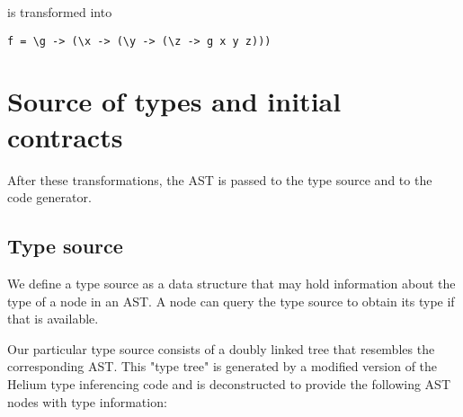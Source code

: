 \documentclass[10pt]{report}
\newcommand{\code}[1]{%
  {%
   \setlength{\fboxsep}{-2\fboxrule}%
   \fcolorbox{black}{light-gray}{\hspace{1.5pt}\strut\texttt{#1}\hspace{1.5pt}}%
  }%
}
\begin{document}
is transformed into

\begin{lstlisting}[caption=Result of lambda argument expansion transformation.]
f = \g -> (\x -> (\y -> (\z -> g x y z)))
\end{lstlisting}

\section{Source of types and initial contracts}
\label{sourceoftypes}
After these transformations, the AST is passed to the type source and to the code generator.

\subsection{Type source}


We define a type source as a data structure that may hold information about the type of a node in an AST.
A node can query the type source to obtain its type if that is available.

Our particular type source consists of a doubly linked tree that resembles the corresponding AST.
This "type tree" is generated by a modified version of the Helium type inferencing code and is deconstructed to provide the following AST nodes with type information:

%
%
\end{document}
